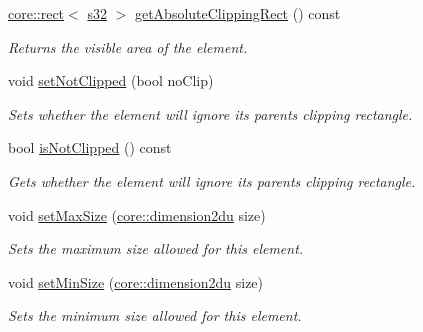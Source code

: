 \begin{DoxyCompactItemize}
\hyperlink{classirr_1_1core_1_1rect}{core\+::rect}$<$ \hyperlink{namespaceirr_ac66849b7a6ed16e30ebede579f9b47c6}{s32} $>$ \hyperlink{classirr_1_1gui_1_1IGUIElement_ad06166ccb3e9c86f17bd2a6cfc627eba}{get\+Absolute\+Clipping\+Rect} () const
\begin{DoxyCompactList}\small\item\em Returns the visible area of the element. \end{DoxyCompactList}\item 
void \hyperlink{classirr_1_1gui_1_1IGUIElement_a814d322989acafa74c895e5c13908b86}{set\+Not\+Clipped} (bool no\+Clip)
\begin{DoxyCompactList}\small\item\em Sets whether the element will ignore its parent\textquotesingle{}s clipping rectangle. \end{DoxyCompactList}\item 
bool \hyperlink{classirr_1_1gui_1_1IGUIElement_a940fcf886f9ae1e4bc719e19057018a2}{is\+Not\+Clipped} () const
\begin{DoxyCompactList}\small\item\em Gets whether the element will ignore its parent\textquotesingle{}s clipping rectangle. \end{DoxyCompactList}\item 
void \hyperlink{classirr_1_1gui_1_1IGUIElement_ae80ad7253fb9fb2ebbeda2a8148fff3e}{set\+Max\+Size} (\hyperlink{namespaceirr_1_1core_a13e5bd7e47b2014eefc870ede11bbbbc}{core\+::dimension2du} size)
\begin{DoxyCompactList}\small\item\em Sets the maximum size allowed for this element. \end{DoxyCompactList}\item 
\mbox{\label{classirr_1_1gui_1_1IGUIElement_ae1ddcdd58af93fea900bd6295d4d8e61}} 
void \hyperlink{classirr_1_1gui_1_1IGUIElement_ae1ddcdd58af93fea900bd6295d4d8e61}{set\+Min\+Size} (\hyperlink{namespaceirr_1_1core_a13e5bd7e47b2014eefc870ede11bbbbc}{core\+::dimension2du} size)
\begin{DoxyCompactList}\small\item\em Sets the minimum size allowed for this element. \end{DoxyCompactList}\item 
\mbox{\label{classirr_1_1gui_1_1IGUIElement_a1eb3d7ec13ebbf8c73859810088f666b}} 

\end{DoxyCompactItemize}
